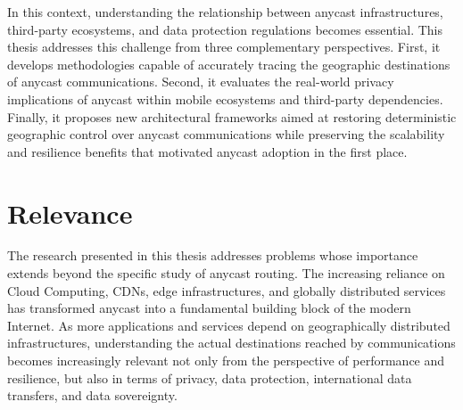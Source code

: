 \documentclass[
A4paper,                %
twoside,                %
openright,              %
chapterprefix=true,     %
12pt,                   %
headings=normal,        %
titlepage=on            %
]{book}
\begin{document}
In this context, understanding the relationship between anycast infrastructures, third-party ecosystems, and data protection regulations becomes essential. This thesis addresses this challenge from three complementary perspectives. First, it develops methodologies capable of accurately tracing the geographic destinations of anycast communications. Second, it evaluates the real-world privacy implications of anycast within mobile ecosystems and third-party dependencies. Finally, it proposes new architectural frameworks aimed at restoring deterministic geographic control over anycast communications while preserving the scalability and resilience benefits that motivated anycast adoption in the first place.

\section{Relevance}
\label{sc:introduction_relevance}

The research presented in this thesis addresses problems whose importance extends beyond the specific study of anycast routing. The increasing reliance on Cloud Computing, CDNs, edge infrastructures, and globally distributed services has transformed anycast into a fundamental building block of the modern Internet. As more applications and services depend on geographically distributed infrastructures, understanding the actual destinations reached by communications becomes increasingly relevant not only from the perspective of performance and resilience, but also in terms of privacy, data protection, international data transfers, and data sovereignty.
\end{document}
